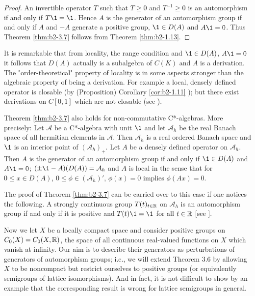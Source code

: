 \begin{proof}
An invertible operator $T$ such that $T \geq 0$ and $T^{-1} \geq 0$ is an automorphism if and only if $T\1 = \1$.
Hence $A$ is the generator of an automorphism group if and only if $A$ and $-A$ generate a positive group, $\1 \in D(A)$ and $A\1 = 0$.
Thus Theorem \ref{thm:b2-3.7} follows from Theorem \ref{thm:b2-1.13}.
\end{proof}

\begin{remark*}\label{rem:b2-3.7a}
It is remarkable that from locality, the range condition and $\1 \in D(A)$, $A\1 = 0$ it follows that $D(A)$ actually is a subalgebra of $C(K)$ and $A$ is a derivation.
The "order-theoretical" property of locality is in some aspects stronger than the algebraic property of being a derivation.
For example a local, densely defined operator is closable (by (\lnm Proposition) Corollary \ref{cor:b2-1.11} ); but there exist derivations on $C[0,1]$ which are not closable (see \citet{brattelirobinson:1975}).
\end{remark*}

\begin{remark*}\label{rem:b2-3.7b}
Theorem \ref{thm:b2-3.7} also holds for non-com\-mutative C*-algebras.
More precisely: Let $\mathcal{A}$ be a C*-algebra with unit $\1$ and let $\mathcal{A}_{h}$ be the real Banach space of all hermitian elements in $\mathcal{A}$.
Then $\mathcal{A}_{h}$ is a real ordered Banach space and $\1$ is an interior point of $(\mathcal{A}_{h})_{+}$.
Let $A$ be a densely defined operator on $\mathcal{A}_{h}$.
Then $A$ is the generator of an automorphism group if and only if $\1 \in D(A)$ and $A\1 = 0$; $(\pm\1 - A)(D(A)) = \mathcal{A}_{h}$ and $A$ is local in the sense that for $0 \leq x \in D(A)$, $0 \leq \phi \in (\mathcal{A}_{h})'$, $\phi(x) = 0$ implies $\phi(Ax) = 0$.

The proof of Theorem \ref{thm:b2-3.7} can be carried over to this case if one notices the following.
A strongly continuous group $T(t)_{t \in \mathbb{R}}$ on $\mathcal{A}_{h}$ is an automorphism group if and only if it is positive and $T(t)\1 = \1$ for all $t \in \mathbb{R}$ [see \citet[Corollary 3.2.21]{brattelirobinson:1979}].
\end{remark*}

Now we let $X$ be a locally compact space and consider positive groups on $C_{0}(X) = C_{0}(X,\mathbb{R})$, the space of all continuous real-valued functions on $X$ which vanish at infinity.
Our aim is to describe their generators as perturbations of generators of automorphism groups; i.e., we will extend Theorem 3.6 by allowing $X$ to be noncompact but
restrict ourselves to positive groups (or equivalently semigroups of lattice isomorphisms).
And in fact, it is not difficult to show by an example that the corresponding result is wrong for lattice semigroups in general.

